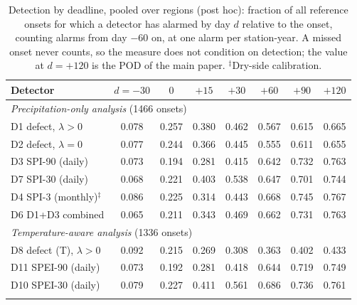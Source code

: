 \begin{table}[tbp]
\caption{Detection by deadline, pooled over regions (post hoc): fraction of all reference onsets for which a
detector has alarmed by day $d$ relative to the onset, counting alarms from day $-60$ on, at one alarm per
station-year. A missed onset never counts, so the measure does not condition on detection; the value at
$d=+120$ is the POD of the main paper. $^{\ddagger}$Dry-side calibration.}
\label{tab:deadline}
\footnotesize\setlength{\tabcolsep}{3pt}
\begin{tabular*}{\textwidth}{@{\extracolsep\fill}lccccccc}
\toprule
Detector & $d=-30$ & $0$ & $+15$ & $+30$ & $+60$ & $+90$ & $+120$\\
\midrule
\multicolumn{8}{l}{\textit{Precipitation-only analysis} (1466 onsets)}\\
\quad D1 defect, $\lambda>0$ & 0.078 & 0.257 & 0.380 & 0.462 & 0.567 & 0.615 & 0.665 \\
\quad D2 defect, $\lambda=0$ & 0.077 & 0.244 & 0.366 & 0.445 & 0.555 & 0.611 & 0.655 \\
\quad D3 SPI-90 (daily) & 0.073 & 0.194 & 0.281 & 0.415 & 0.642 & 0.732 & 0.763 \\
\quad D7 SPI-30 (daily) & 0.068 & 0.221 & 0.403 & 0.538 & 0.647 & 0.701 & 0.744 \\
\quad D4 SPI-3 (monthly)$^{\ddagger}$ & 0.086 & 0.225 & 0.314 & 0.443 & 0.668 & 0.745 & 0.767 \\
\quad D6 D1+D3 combined & 0.065 & 0.211 & 0.343 & 0.469 & 0.662 & 0.731 & 0.763 \\
\midrule
\multicolumn{8}{l}{\textit{Temperature-aware analysis} (1336 onsets)}\\
\quad D8 defect (T), $\lambda>0$ & 0.092 & 0.215 & 0.269 & 0.308 & 0.363 & 0.402 & 0.433 \\
\quad D11 SPEI-90 (daily) & 0.073 & 0.192 & 0.281 & 0.418 & 0.644 & 0.719 & 0.749 \\
\quad D10 SPEI-30 (daily) & 0.079 & 0.227 & 0.411 & 0.561 & 0.686 & 0.736 & 0.761 \\
\botrule
\end{tabular*}
\end{table}

